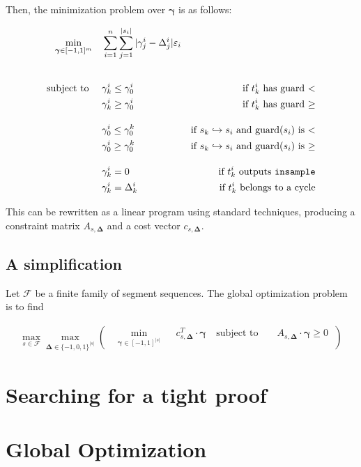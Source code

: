 \documentclass{article}
\renewcommand{\epsilon}{\varepsilon}
\newcommand{\1}{\langle 1 \rangle}
\newcommand{\2}{\langle 2 \rangle}
\begin{document}
Then, the minimization problem over $\boldsymbol{\gamma}$ is as follows:

\begin{align*}
\min_{\boldsymbol{\gamma} \in [-1, 1]^m} \quad & \sum_{i = 1}^n \sum_{j = 1}^{|s_i|} |\gamma^i_j - \Delta^i_j| \epsilon_i \\[2em]
\text{subject to } \quad 
& \gamma^i_k \leq \gamma^i_0 &\text{if $t^i_k$ has guard $<$} \\
& \gamma^i_k \geq \gamma^i_0 &\text{if $t^i_k$ has guard $\geq$} 
\\[1em]
& \gamma^i_0 \leq \gamma_0^k &\text{if $s_k \hookrightarrow s_i$ and guard($s_i$) is $<$} \\
& \gamma^i_0 \geq \gamma_0^k &\text{if $s_k \hookrightarrow s_i$ and guard($s_i$) is $\geq$} 
\\[1em]
& \gamma^i_k = 0 &\text{if $t^i_k$ outputs \texttt{insample}} \\
& \gamma^i_k = \Delta^i_k &\text{if $t^i_k$ belongs to a cycle} 
\end{align*}

This can be rewritten as a linear program using standard techniques, producing a constraint matrix $A_{s, \boldsymbol{\Delta}}$ and a cost vector $c_{s, \boldsymbol{\Delta}}$.

\subsection{A simplification}

Let $\mathcal{F}$ be a finite family of segment sequences. The global optimization problem is to find 

\begin{align*}
\max_{s \in \mathcal{F}} \max_{\boldsymbol{\Delta} \in {\{-1, 0, 1\}}^{|s|}} \left(
\begin{aligned}
& \underset{\boldsymbol{\gamma} \in [-1, 1]^{|s|}}{\min} & &  c_{s , \boldsymbol{\Delta}}^T \cdot \boldsymbol{\gamma}  \
& \text{subject to } & & A_{s, \boldsymbol{\Delta}} \cdot \boldsymbol{\gamma} \geq 0 \
\end{aligned}
\right)
\end{align*}

\section{Searching for a tight proof}

\newpage
\section{Global Optimization}
\end{document}
